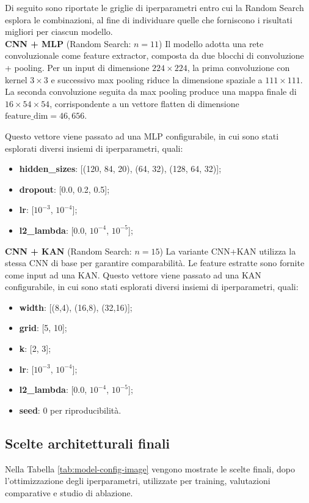\documentclass[a4paper,12pt]{report}
\begin{document}
	Di seguito sono riportate le griglie di iperparametri entro cui la Random Search esplora le combinazioni, al fine di individuare quelle che forniscono i risultati migliori per ciascun modello. \\
	
	\smallskip
	\noindent\textbf{CNN + MLP} \quad (Random Search: $n=11$)  
	Il modello adotta una rete convoluzionale come feature extractor, composta da due blocchi di convoluzione + pooling. Per un input di dimensione \(224\times224\), la prima convoluzione con kernel \(3\times3\) e successivo max pooling riduce la dimensione spaziale a \(111\times111\). La seconda convoluzione seguita da max pooling produce una mappa finale di \(16\times54\times54\), corrispondente a un vettore flatten di dimensione \(\text{feature\_dim} = 46,656\).
	
	Questo vettore viene passato ad una MLP configurabile, in cui sono stati esplorati diversi insiemi di iperparametri, quali:  
	\begin{itemize}
		\item \textbf{hidden\_sizes}: [(120, 84, 20), (64, 32), (128, 64, 32)];
		\item \textbf{dropout}: [0.0, 0.2, 0.5];
		\item \textbf{lr}: [$10^{-3}$, $10^{-4}$];
		\item \textbf{l2\_lambda}: [0.0, $10^{-4}$, $10^{-5}$];
	\end{itemize}
	
	\smallskip
	\noindent\textbf{CNN + KAN} \quad (Random Search: $n=15$)  
	La variante CNN+KAN utilizza la stessa CNN di base per garantire comparabilità. Le feature estratte sono fornite come input ad una KAN. Questo vettore viene passato ad una KAN configurabile, in cui sono stati esplorati diversi insiemi di iperparametri, quali: 
	\begin{itemize}
		\item \textbf{width}: [(8,4), (16,8), (32,16)];
		\item \textbf{grid}: [5, 10];
		\item \textbf{k}: [2, 3];
		\item \textbf{lr}: [$10^{-3}$, $10^{-4}$];
		\item \textbf{l2\_lambda}: [0.0, $10^{-4}$, $10^{-5}$];
		\item \textbf{seed}: 0 per riproducibilità.
	\end{itemize}
	
	\subsection{Scelte architetturali finali}
	Nella Tabella \ref{tab:model-config-image} vengono mostrate le scelte finali, dopo l'ottimizzazione degli iperparametri, utilizzate per training, valutazioni comparative e studio di ablazione.
	
\end{document}
